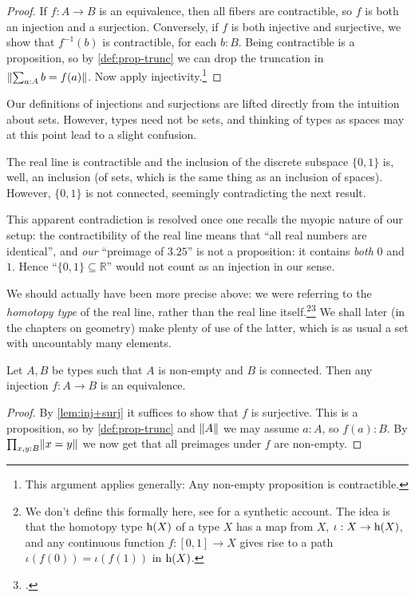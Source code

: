 \begin{proof}
If $f: A\to B$ is an equivalence, then all fibers are contractible,
so $f$ is both an injection and a surjection. Conversely,
if $f$ is both injective and surjective, we show that
$f^{-1}(b)$ is contractible, for each $b:B$. 
Being contractible is a proposition, so by \cref{def:prop-trunc}
we can drop the truncation in $\lVert\sum_{a:A} b=f(a)\rVert$.
Now apply injectivity.\footnote{%
  This argument applies generally:
  Any non-empty proposition is contractible.}
\end{proof}
\begin{remark}
  \label{rem:injectionsurjectionisnotwhatyouthink}
  Our definitions of injections and surjections are lifted directly from the intuition about sets.  However, types need not be sets, and thinking of types as spaces may at this point lead to a slight confusion.  

The real line is contractible and the inclusion of the discrete subspace $\{0,1\}$ is, well, an inclusion (of sets, which is the same thing as an inclusion of spaces).  However, $\{0,1\}$ is not connected, seemingly contradicting the next result.

  This apparent contradiction is resolved once one recalls the myopic nature of our setup: the contractibility of the real line means that ``all real numbers are identical'', and \emph{our} ``preimage of $3.25$'' is not a proposition: it contains \emph{both} $0$ and $1$.  Hence ``$\{0,1\}\subseteq\mathbb R$'' would not count as an injection in our sense.

  We should actually have been more precise above: we were referring to the \emph{homotopy type} of the real line, rather than the real line itself.\footnote{%
    We don't define this formally here,
    see \citeauthor{Shulman-Real-Cohesive}\footnotemark{} for a synthetic account.
    The idea is that the homotopy type $\mathrm{h}(X)$ of a type $X$
    has a map from $X$, $\iota : X \to \mathrm{h}(X)$,
    and any continuous function $f : [0,1] \to X$
    gives rise to a path
    $\iota(f(0)) = \iota(f(1))$ in
    $\mathrm{h}(X)$.}\footcitetext{Shulman-Real-Cohesive}
  We shall later (in the chapters on geometry) make plenty of use of the latter,
  which is as usual a set with uncountably many elements.
\end{remark}

\begin{corollary}\label{cor:inj+connected}
Let $A,B$ be types such that $A$ is non-empty and $B$ is connected.
Then any injection $f: A\to B$ is an equivalence.
\end{corollary}
\begin{proof}
By \cref{lem:inj+surj} it suffices to show that $f$ is surjective.
This is a proposition, so by \cref{def:prop-trunc} and $\lVert A\rVert$
we may assume $a:A$, so $f(a):B$. By $\prod_{x,y:B} \lVert x=y\rVert$
we now get that all preimages under $f$ are non-empty.
\end{proof}

